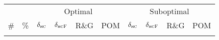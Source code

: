 \documentclass[letterpaper]{article}
\newcommand{\dhc}{\ensuremath{\delta_{\textsc{hc}}}}
\newcommand{\dhcf}{\ensuremath{\delta_{\textsc{hcF}}}}
\newcommand{\rg}{R\&G}
\newcommand{\pom}{POM}
\begin{document}
\begin{table*}[]
\centering
\fontsize{5}{6}\selectfont
\setlength\tabcolsep{1.5pt}
\begin{tabular}{cc|cccc|cccc|}
\toprule
 \multicolumn{2}{c}{} & \multicolumn{4}{c}{Optimal} & \multicolumn{4}{c}{Suboptimal}\\
\cmidrule(lr){3-6}\cmidrule(lr){7-10}
%
\# & \% & \dhc & \dhcf & \rg & \pom & \dhc & \dhcf & \rg & \pom\\%
%
\midrule
\\
\bottomrule
\end{tabular}\\
\caption{}
\end{table*}
\end{document}
